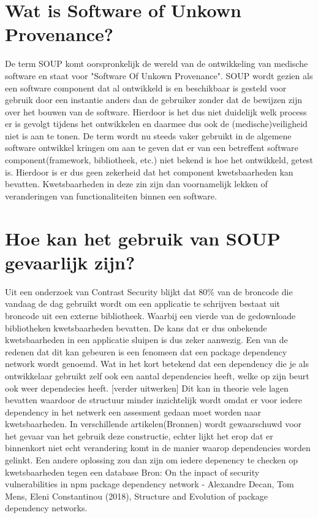 \section{Wat is Software of Unkown Provenance?}\label{sec:wat-is-soup?}
De term SOUP komt oorspronkelijk de wereld van de ontwikkeling van medische software en staat voor "Software Of Unkown Provenance".
SOUP wordt gezien als een software component dat al ontwikkeld is en beschikbaar is gesteld voor gebruik door een instantie anders dan de gebruiker zonder dat de bewijzen zijn over het bouwen van de software.
Hierdoor is het dus niet duidelijk welk process er is gevolgt tijdens het ontwikkelen en daarmee dus ook de (medische)veiligheid niet is aan te tonen.
De term wordt nu steeds vaker gebruikt in de algemene software ontwikkel kringen om aan te geven dat er van een betreffent software component(framework, bibliotheek, etc.) niet bekend is hoe het ontwikkeld, getest is.
Hierdoor is er dus geen zekerheid dat het component kwetsbaarheden kan bevatten.
Kwetsbaarheden in deze zin zijn dan voornamelijk lekken of veranderingen van functionaliteiten binnen een software.


\section{Hoe kan het gebruik van SOUP gevaarlijk zijn?}\label{sec:hoe-kan-het-gebruik-van-soup-gevaarlijk-zijn?}
Uit een onderzoek van Contrast Security blijkt dat 80\% van de broncode die vandaag de dag gebruikt wordt om een applicatie te schrijven bestaat uit broncode uit een externe bibliotheek.
Waarbij een vierde van de gedownloade bibliotheken kwetsbaarheden bevatten.
De kans dat er dus onbekende kwetsbaarheden in een applicatie sluipen is dus zeker aanwezig.
Een van de redenen dat dit kan gebeuren is een fenomeen dat een package dependency network wordt genoemd.
Wat in het kort betekend dat een dependency die je als ontwikkelaar gebruikt zelf ook een aantal dependencies heeft, welke op zijn beurt ook weer dependecies heeft.
[verder uitwerken]
Dit kan in theorie vele lagen bevatten waardoor de structuur minder inzichtelijk wordt omdat er voor iedere dependency in het netwerk een assesment gedaan moet worden naar kwetsbaarheden.
In verschillende artikelen(Bronnen) wordt gewaarschuwd voor het gevaar van het gebruik deze constructie, echter lijkt het erop dat er binnenkort niet echt verandering komt in de manier waarop dependencies worden gelinkt.
Een andere oplossing zou dan zijn om iedere depenency te checken op kwetsbaarheden tegen een database
Bron: On the inpact of security vulnerabilities in npm package dependency network - Alexandre Decan, Tom Mens, Eleni Constantinou (2018), Structure and Evolution of package dependency networks.

